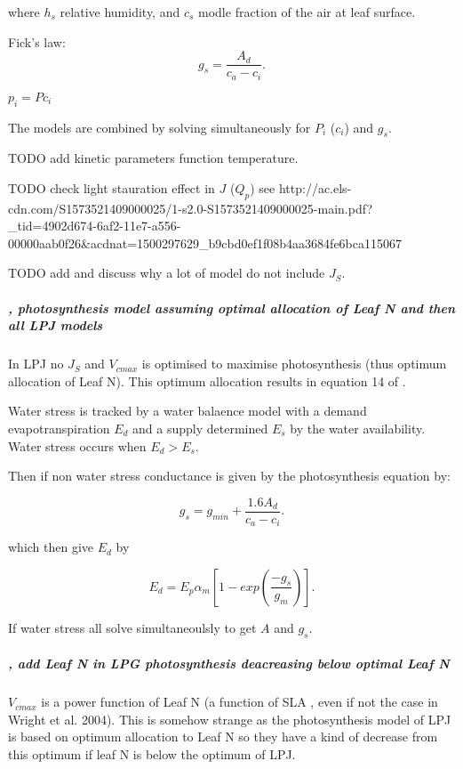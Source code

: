 \documentclass[a4paper,11pt]{article}
\begin{document}
where $h_s$ relative humidity, and $c_s$ modle fraction of the air at leaf surface.

Fick's law:
\begin{equation}
\label{eq:fick}
g_s=\frac{A_d}{c_a - c_i}.
\end{equation}

$p_i = P c_i$

The models are combined by solving simultaneously for $P_i$ ($c_i$) and $g_s$.

TODO add kinetic parameters function temperature.

TODO check light stauration effect in $J$ ($Q_p$) see http://ac.els-cdn.com/S1573521409000025/1-s2.0-S1573521409000025-main.pdf?_tid=4902d674-6af2-11e7-a556-00000aab0f26&acdnat=1500297629_b9cbd0ef1f08b4aa3684fe6bca115067

TODO add and discuss why a lot of model do not include $J_S$.


\subparagraph{\citet{Haxeltine-1996}, photosynthesis model assuming optimal allocation of Leaf N and then all LPJ models}

In LPJ no $J_S$ and $V_{cmax}$ is optimised to maximise photosynthesis (thus optimum allocation of Leaf N). This optimum allocation results in equation 14 of \citet{Sitch-2008}.

Water stress is tracked by a water balaence model with a demand evapotranspiration $E_d$ and a supply determined $E_s$ by the water availability. Water stress occurs when $E_d > E_s$.

Then if non water stress conductance is given by the photosynthesis equation by:

\begin{equation}
\label{eq:fickLPJ}
g_s=g_{min} + \frac{1.6A_d}{c_a - c_i}.
\end{equation}

 which then give $E_{d}$ by 

\begin{equation}
\label{eq:12Sitch}
E_d=E_p \alpha_m [1 - exp(\frac{- g_s}{g_m})].
\end{equation}

If water stress all solve simultaneoulsly to get $A$ and $g_s$. 

\subparagraph{\citet{Sakschewski-2015}, add Leaf N in LPG photosynthesis deacreasing below optimal Leaf N}

$V_{cmax}$ is a power function of Leaf N (a function of SLA , even if not the case in Wright et al. 2004). This is somehow strange as the photosynthesis model of LPJ is based on optimum allocation to Leaf N so they have a kind of decrease from this optimum if leaf N is below the optimum of LPJ.
\end{document}
